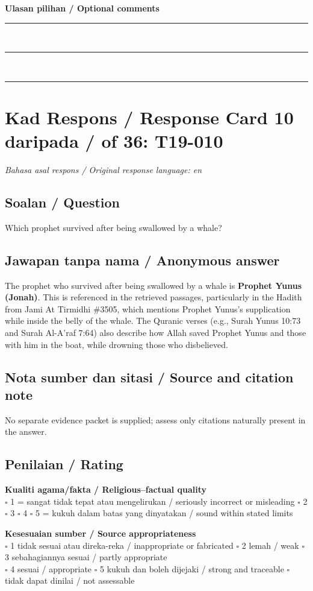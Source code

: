 \documentclass[11pt,a4paper]{article}
\begin{document}
\medskip
\textbf{Ulasan pilihan / Optional comments}\\[3pt]
\rule{\textwidth}{0.4pt}\\[16pt]
\rule{\textwidth}{0.4pt}\\[16pt]
\rule{\textwidth}{0.4pt}

\newpage
\section*{Kad Respons / Response Card 10 daripada / of 36: T19-010}
\textit{Bahasa asal respons / Original response language: en}

\subsection*{Soalan / Question}
Which prophet survived after being swallowed by a whale?

\subsection*{Jawapan tanpa nama / Anonymous answer}
The prophet who survived after being swallowed by a whale is \textbf{Prophet Yunus (Jonah)}. This is referenced in the retrieved passages, particularly in the Hadith from Jami At Tirmidhi \#3505, which mentions Prophet Yunus's supplication while inside the belly of the whale. The Quranic verses (e.g., Surah Yunus 10:73 and Surah Al-A'raf 7:64) also describe how Allah saved Prophet Yunus and those with him in the boat, while drowning those who disbelieved.

\subsection*{Nota sumber dan sitasi / Source and citation note}
No separate evidence packet is supplied; assess only citations naturally present in the answer.

\subsection*{Penilaian / Rating}
\textbf{Kualiti agama/fakta / Religious--factual quality}\\
$\square$ 1 = sangat tidak tepat atau mengelirukan / seriously incorrect or misleading \quad
$\square$ 2 \quad $\square$ 3 \quad $\square$ 4 \quad
$\square$ 5 = kukuh dalam batas yang dinyatakan / sound within stated limits

\medskip
\textbf{Kesesuaian sumber / Source appropriateness}\\
$\square$ 1 tidak sesuai atau direka-reka / inappropriate or fabricated \quad
$\square$ 2 lemah / weak \quad $\square$ 3 sebahagiannya sesuai / partly appropriate\\
$\square$ 4 sesuai / appropriate \quad $\square$ 5 kukuh dan boleh dijejaki / strong and traceable \quad
$\square$ tidak dapat dinilai / not assessable
\end{document}
